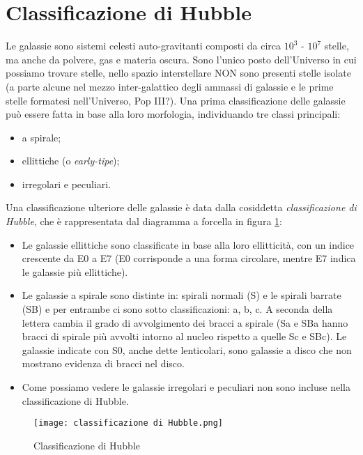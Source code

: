 \section{Classificazione di Hubble}
Le galassie sono sistemi celesti auto-gravitanti composti da circa $10^3$ - $10^7$ stelle, ma anche da polvere, gas e materia oscura. Sono l'unico posto dell'Universo in cui possiamo trovare stelle, nello spazio interstellare NON sono presenti stelle isolate (a parte alcune nel mezzo inter-galattico degli ammassi di galassie e le prime stelle formatesi nell’Universo, Pop III?).
Una prima classificazione delle galassie può essere fatta in base alla loro morfologia, individuando tre classi principali:
\begin{itemize}
    \item a spirale;
    \item ellittiche (o \textit{early-tipe});
    \item irregolari e peculiari.
\end{itemize}

Una classificazione ulteriore delle galassie è data dalla cosiddetta \emph{classificazione di Hubble}, che è rappresentata
dal diagramma a forcella in figura \ref{fig:classificazione_di_Hubble}:
\begin{itemize}
    \item Le galassie ellittiche sono classificate in base alla loro ellitticità, con un indice crescente da E0 a E7 (E0 corrisponde a una forma circolare, mentre E7 indica le galassie più ellittiche).
    \item Le galassie a spirale sono distinte in: spirali normali (S) e le spirali barrate (SB) e per entrambe ci sono sotto classificazioni: a, b, c. A seconda della lettera cambia il grado di avvolgimento dei bracci a spirale (Sa e SBa hanno bracci di spirale più avvolti intorno al nucleo rispetto a quelle Sc e SBc). Le galassie indicate con S0, anche dette lenticolari, sono galassie a disco che non mostrano evidenza di bracci nel disco.
    \item Come possiamo vedere le galassie irregolari e peculiari non sono incluse nella classificazione di Hubble.
\end{itemize}

\begin{figure}
    \centering
    \texttt{[image: classificazione di Hubble.png]}
    \caption{Classificazione di Hubble}
    \label{fig:classificazione_di_Hubble}
\end{figure}

